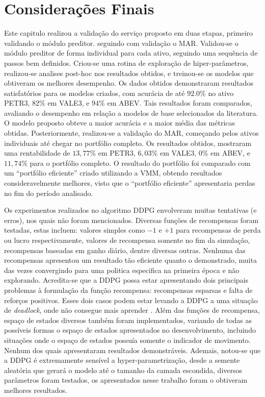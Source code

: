 \section{Considerações Finais}
\label{exp:consideracoes}

Este capitulo realizou a validação do serviço proposto em duas etapas, primeiro validando o módulo preditor. seguindo com validação o \acrshort{MAR}. Validou-se o módulo preditor de forma individual para cada ativo, seguindo uma sequência de passos bem definidos. Criou-se uma rotina de exploração de hiper-parâmetros, realizou-se analises post-hoc nos resultados obtidos, e treinou-se os modelos que obtiveram os melhores desempenho. Os dados obtidos demonstraram resultados satisfatórios para os modelos criados, com acurácia de até $92.0\%$ no ativo PETR3, $82\%$ em VALE3, e $94\%$ em ABEV. Tais resultados foram comparados, avaliando o desempenho em relação a modelos de base selecionados da literatura. O modelo proposto obteve a maior acurácia e a maior média das métricas obtidas. Posteriormente, realizou-se a validação do \acrshort{MAR}, começando pelos ativos individuais até chegar no portfólio completo. Os resultados obtidos, mostraram uma rentabilidade de $13,77\%$ em PETR3, $6,03\%$ em VALE3, $0\%$ em ABEV, e $11,74\%$ para o portfólio completo. O resultado do portfólio foi comparado com um 
``portfólio eficiente'' criado utilizando a \acrshort{VMM}, obtendo resultados consideravelmente melhores, visto que o ``portfólio eficiente'' apresentaria perdas no fim do período analisado.
 
Os experimentos realizados no algoritmo \acrshort{DDPG} envolveram muitas tentativas (e erros), nos quais não foram mencionados. Diversas funções de recompensas foram testadas, estas incluem: valores simples como $-1$ e $+1$ para recompensas de perda ou lucro respectivamente, valores de recompensa somente no fim da simulação, recompensas baseadas em ganho diário, dentre diversas outras. Nenhuma das recompensas apresentou um resultado tão eficiente quanto o demonstrado, muita das vezes convergindo para uma politica especifica na primeira época e não explorando. Acredita-se que a \acrshort{DDPG} possa estar apresentando dois principais problemas à formulação da função recompensa: recompensas esparsas e falta de reforços positivos. Esses dois casos podem estar levando a \acrshort{DDPG} a uma situação de \emph{deadlock}, onde não consegue mais aprender \cite{}. Além das funções de recompensa, espaço de estados diversos também foram implementados, variando de todas as possíveis formas o espaço de estados apresentados no desenvolvimento, incluindo situações onde o espaço de estados possuía somente o indicador de movimento. Nenhum dos quais apresentaram resultados demonstráveis. Ademais, notou-se que a \acrshort{DDPG} é extremamente sensível a hyper-parametrização, desde a semente aleatória que gerará o modelo até o tamanho da camada escondida, diversos parâmetros foram testados, os apresentados nesse trabalho foram o obtiveram melhores resultados.

